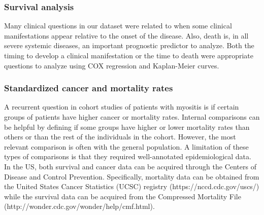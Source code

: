 \subsubsection{Survival analysis}
Many clinical questions in our dataset were related to when some clinical manifestations appear relative to the onset of the disease. Also, death is, in all severe systemic diseases, an important prognostic predictor to analyze. Both the timing to develop a clinical manifestation or the time to death were appropriate questions to analyze using COX regression and Kaplan-Meier curves.

\subsubsection{Standardized cancer and mortality rates}
A recurrent question in cohort studies of patients with myositis is if certain groups of patients have higher cancer or mortality rates. Internal comparisons can be helpful by defining if some groups have higher or lower mortality rates than others or than the rest of the individuals in the cohort. However, the most relevant comparison is often with the general population. A limitation of these types of comparisons is that they required well-annotated epidemiological data. In the US, both survival and cancer data can be acquired through the Centers of Disease and Control Prevention. Specifically, mortality data can be obtained from the United States Cancer Statistics (UCSC) registry (https://nccd.cdc.gov/uscs/) while the survival data can be acquired from the Compressed Mortality File (http://wonder.cdc.gov/wonder/help/cmf.html).